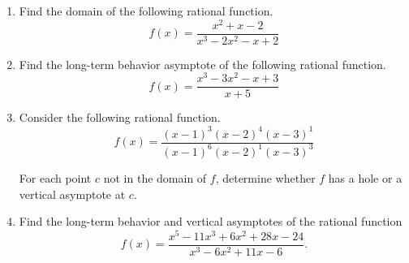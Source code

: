 \documentclass{article}
\begin{document}
\ActivityTitle[class={College Algebra}, number={6}, name={Rational Functions}]

\begin{enumerate}
\item Find the domain of the following rational function. \[ f(x) = \frac{x^2 + x - 2}{x^3 - 2x^2 - x + 2} \] \vspace{3cm}

\item Find the long-term behavior asymptote of the following rational function. \[ f(x) = \frac{x^3 - 3x^2 - x + 3}{x + 5} \] \vspace{7cm}

\item Consider the following rational function. \[ f(x) = \frac{(x-1)^{3}(x-2)^{4}(x-3)^{1}}{(x-1)^{6}(x-2)^{1}(x-3)^{3}} \]

For each point $c$ not in the domain of $f$, determine whether $f$ has a hole or a vertical asymptote at $c$. \vspace{3cm}

\newpage

\item Find the long-term behavior and vertical asymptotes of the rational function \[ f(x) = \frac{x^5 - 11x^3 + 6x^2 + 28x - 24}{x^3 - 6x^2 + 11x - 6}. \] \vspace{3cm}
\end{enumerate}
\end{document}
